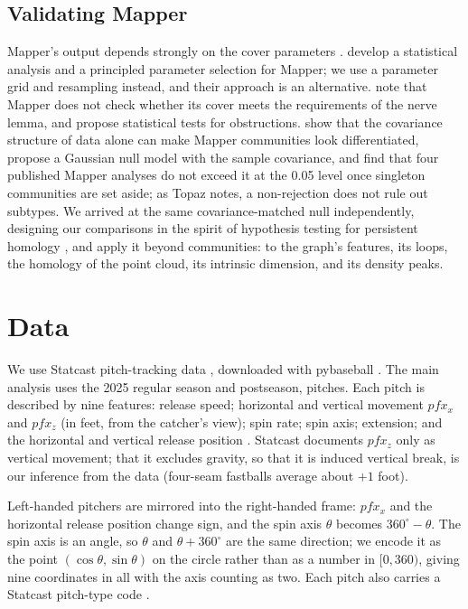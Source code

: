 \documentclass{article}
\theoremstyle{definition}
\theoremstyle{remark}
\begin{document}
\subsection{Validating Mapper}
Mapper's output depends strongly on the cover parameters \parencite{carrieremicheloudot2018}.
\textcite{carrieremicheloudot2018} develop a statistical analysis and a principled parameter selection for Mapper; we use a parameter grid and resampling instead, and their approach is an alternative.
\textcite{vejdemojohansson2018certified} note that Mapper does not check whether its cover meets the requirements of the nerve lemma, and propose statistical tests for obstructions.
\textcite{topaz2026null} show that the covariance structure of data alone can make Mapper communities look differentiated, propose a Gaussian null model with the sample covariance, and find that four published Mapper analyses do not exceed it at the 0.05 level once singleton communities are set aside; as Topaz notes, a non-rejection does not rule out subtypes.
We arrived at the same covariance-matched null independently, designing our comparisons in the spirit of hypothesis testing for persistent homology \parencite{robinsonturner2017,blumberg2014}, and apply it beyond communities: to the graph's features, its loops, the homology of the point cloud, its intrinsic dimension, and its density peaks.

\section{Data}\label{sec:data}
We use Statcast pitch-tracking data \parencite{savantcsvdocs}, downloaded with pybaseball \parencite{ledoux_pybaseball}.
The main analysis uses the 2025 regular season and postseason, \NPitches{} pitches.
Each pitch is described by nine features: release speed; horizontal and vertical movement $pfx_x$ and $pfx_z$ (in feet, from the catcher's view); spin rate; spin axis; extension; and the horizontal and vertical release position \parencite{savantcsvdocs}.
Statcast documents $pfx_z$ only as vertical movement; that it excludes gravity, so that it is induced vertical break, is our inference from the data (four-seam fastballs average about $+1$ foot).

Left-handed pitchers are mirrored into the right-handed frame: $pfx_x$ and the horizontal release position change sign, and the spin axis $\theta$ becomes $360^\circ - \theta$.
The spin axis is an angle, so $\theta$ and $\theta + 360^\circ$ are the same direction; we encode it as the point $(\cos\theta, \sin\theta)$ on the circle rather than as a number in $[0, 360)$, giving nine coordinates in all with the axis counting as two.
Each pitch also carries a Statcast pitch-type code \parencite{mlbglossary_pitchtypes}.
\end{document}
